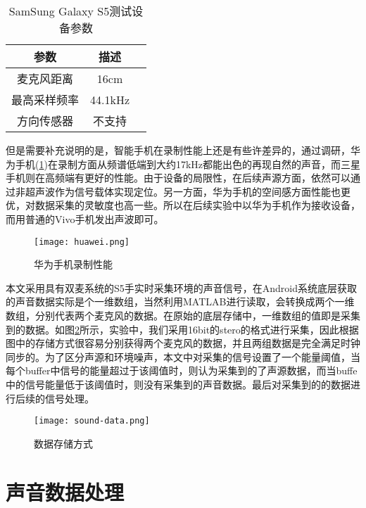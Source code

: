 \documentclass[winfonts,oneside]{njuthesis}
\begin{document}
		\begin{table}[H]
			\setlength{\belowcaptionskip}{7pt}
			\caption{SamSung Galaxy S5测试设备参数}
			\centering
			\begin{tabular}{ccc}
				\hline 
				参数 & 描述 \\
				\hline
				麦克风距离 & 16cm \\
				最高采样频率 & 44.1kHz\\
				方向传感器 & 不支持\\
				\hline
			\end{tabular} 
			\vspace{0.2cm}
			\label{table: parameters-of-S5}
		\end{table}
	
		但是需要补充说明的是，智能手机在录制性能上还是有些许差异的，通过调研，华为手机(\ref{fig: huawei})在录制方面从频谱低端到大约17kHz都能出色的再现自然的声音，而三星手机则在高频端有更好的性能。由于设备的局限性，在后续声源方面，依然可以通过非超声波作为信号载体实现定位。另一方面，华为手机的空间感方面性能也更优，对数据采集的灵敏度也高一些。所以在后续实验中以华为手机作为接收设备，而用普通的Vivo手机发出声波即可。
		
		\begin{figure}[H]
			\centering
			\texttt{[image: huawei.png]} 
			\caption{华为手机录制性能}
			\label{fig: huawei}
		\end{figure}
	
		本文采用具有双麦系统的S5手实时采集环境的声音信号，在Android系统底层获取的声音数据实际是个一维数组，当然利用MATLAB进行读取，会转换成两个一维数组，分别代表两个麦克风的数据。在原始的底层存储中，一维数组的值即是采集到的数据。如图\ref{fig: sound-data}所示，实验中，我们采用16bit的stero的格式进行采集，因此根据图中的存储方式很容易分别获得两个麦克风的数据，并且两组数据是完全满足时钟同步的。为了区分声源和环境噪声，本文中对采集的信号设置了一个能量阈值，当每个buffer中信号的能量超过于该阈值时，则认为采集到的了声源数据，而当buffe中的信号能量低于该阈值时，则没有采集到的声音数据。最后对采集到的的数据进行后续的信号处理。
		
		\begin{figure}[H]
			\centering
			\texttt{[image: sound-data.png]} 
			\caption{数据存储方式}
			\label{fig: sound-data}
		\end{figure}
	
	\section{声音数据处理}
	
\end{document}
